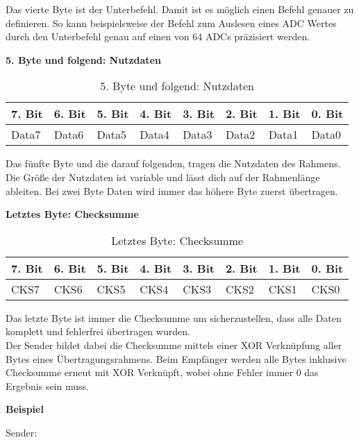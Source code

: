 Das vierte Byte ist der Unterbefehl. Damit ist es möglich einen Befehl genauer zu definieren. So kann beispielsweise der Befehl zum Auslesen eines \ac{ADC} Wertes durch den Unterbefehl genau auf einen von 64 \acp{ADC} präzisiert werden.


\textbf{5. Byte und folgend: Nutzdaten}

\begin{table}[H]
\begin{center}
\begin{tabularx}{\textwidth}{|X|X|X|X|X|X|X|X|}\hline
 7. Bit & 6. Bit & 5. Bit & 4. Bit & 3. Bit & 2. Bit & 1. Bit & 0. Bit\\ \hline
 Data7 & Data6 & Data5 & Data4 & Data3 & Data2 & Data1 & Data0\\ \hline
\end{tabularx}
\caption{5. Byte und folgend: Nutzdaten}
\label{table_5Byte}
\end{center}
\end{table}

Das fünfte Byte und die darauf folgenden, tragen die Nutzdaten des Rahmens. Die Größe der Nutzdaten ist variable und lässt dich auf der Rahmenlänge ableiten. Bei zwei Byte Daten wird immer das höhere Byte zuerst übertragen.


\textbf{Letztes Byte: Checksumme}

\begin{table}[H]
\begin{center}
\begin{tabularx}{\textwidth}{|X|X|X|X|X|X|X|X|}\hline
 7. Bit & 6. Bit & 5. Bit & 4. Bit & 3. Bit & 2. Bit & 1. Bit & 0. Bit\\ \hline
 CKS7 & CKS6 & CKS5 & CKS4 & CKS3 & CKS2 & CKS1 & CKS0\\ \hline
\end{tabularx}
\caption{Letztes Byte: Checksumme}
\label{table_LastByte}
\end{center}
\end{table}

Das letzte Byte ist immer die Checksumme um sicherzustellen, dass alle Daten komplett und fehlerfrei übertragen wurden.\\
Der Sender bildet dabei die Checksumme mittels einer XOR Verknüpfung aller Bytes eines Übertragungsrahmens. Beim Empfänger werden alle Bytes inklusive Checksumme erneut mit XOR Verknüpft, wobei ohne Fehler immer 0 das Ergebnis sein muss.

\textbf{Beispiel}

Sender:
 
